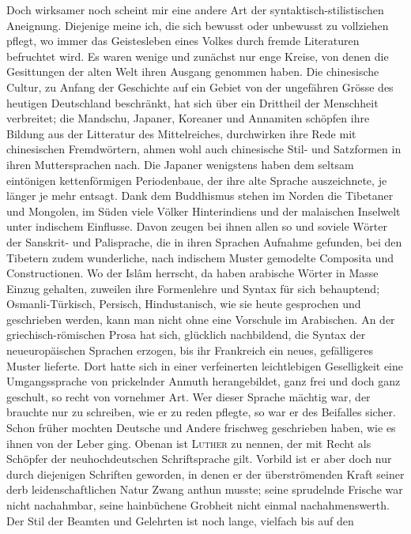 {Doch wirksamer noch scheint mir eine andere Art der syntaktisch-\label{fp.265}stilis\-tischen Aneignung. Diejenige meine ich, die sich bewusst oder unbewusst zu vollziehen pflegt, wo immer das Geistesleben eines Volkes durch fremde Literaturen befruchtet wird. Es waren wenige und zunächst nur enge Kreise, von denen die Gesittungen der alten Welt ihren Ausgang genommen haben. Die chinesische Cultur, zu Anfang der Geschichte auf ein Gebiet von der ungefähren Grösse des heutigen Deutschland beschränkt, hat sich über ein Drittheil der Menschheit verbreitet; die Mandschu, Japaner, Koreaner und Annamiten schöpfen ihre Bildung aus der Litteratur des Mittelreiches, durchwirken ihre Rede mit chinesischen Fremdwörtern, ahmen wohl auch chinesische Stil- und Satzformen in ihren Muttersprachen nach. Die Japaner wenigstens haben dem seltsam eintönigen kettenförmigen Periodenbaue, der ihre alte Sprache auszeichnete, je länger je mehr entsagt.  Dank dem Buddhismus stehen im Norden die Tibetaner und Mongolen, im Süden viele Völker Hinterindiens und der malaischen Inselwelt unter indischem Einflusse. Davon zeugen bei ihnen allen so und soviele Wörter der Sanskrit- und Palisprache, die in ihren Sprachen Aufnahme gefunden, bei den Tibetern zudem wunderliche, nach indischem Muster gemodelte Composita und Constructionen. Wo der Islâm herrscht, da haben arabische Wörter in Masse Einzug gehalten, zuweilen ihre Formenlehre und Syntax für sich behauptend; Osmanli-Türkisch, Persisch, Hindustanisch, wie sie heute gesprochen und geschrieben werden, kann man nicht  ohne eine Vorschule im Arabischen. An der griechisch-römischen Prosa hat sich, glücklich nachbildend, die Syntax der neueuropäischen Sprachen erzogen, bis ihr Frankreich ein neues, gefälligeres Muster lieferte. Dort hatte sich in einer verfeinerten leichtlebigen Geselligkeit eine Umgangssprache von prickelnder Anmuth herangebildet, ganz frei und doch ganz geschult, so recht von vornehmer Art. Wer dieser Sprache mächtig war, der brauchte nur zu schreiben, wie er zu reden pflegte, so war er des Beifalles sicher. Schon früher mochten Deutsche und Andere frischweg geschrieben haben, wie es ihnen von der Leber ging. Obenan ist \textsc{Luther} zu nennen, der mit Recht als Schöpfer der neuhochdeutschen Schriftsprache gilt. Vorbild ist er aber doch nur durch diejenigen Schriften ge\-\label{sp.272}worden, in denen er der überströmenden Kraft seiner derb leidenschaftlichen Natur Zwang anthun musste; seine sprudelnde Frische war nicht nachahmbar, seine hainbüchene Grobheit nicht einmal nachahmenswerth. Der Stil der Beamten und Gelehrten ist noch lange, vielfach bis auf den }
